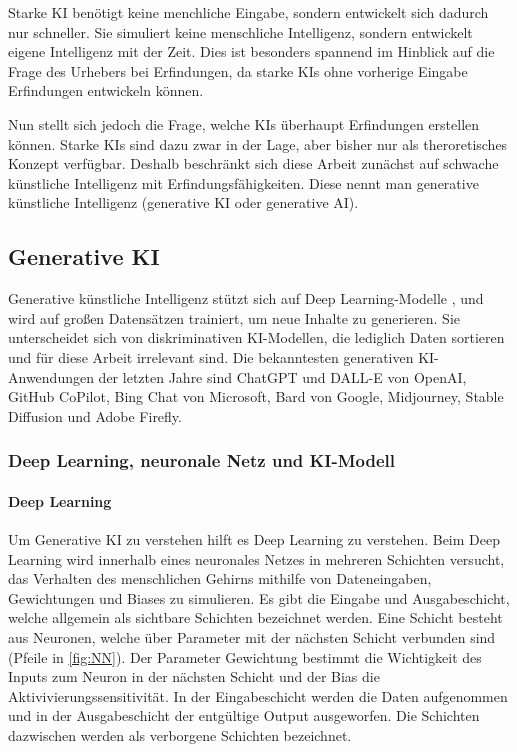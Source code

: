 Starke KI benötigt keine menchliche Eingabe, 
sondern entwickelt sich dadurch nur schneller. 
Sie simuliert keine menschliche Intelligenz, 
sondern entwickelt eigene Intelligenz mit der Zeit. 
Dies ist besonders spannend im Hinblick auf die Frage 
des Urhebers bei Erfindungen, 
da starke KIs ohne vorherige Eingabe Erfindungen entwickeln können.
\cite{WasIstStarke2023}

Nun stellt sich jedoch die Frage,
welche KIs überhaupt 
Erfindungen erstellen können. Starke KIs sind dazu zwar in 
der Lage, aber bisher nur als theroretisches Konzept verfügbar. 
Deshalb beschränkt sich diese Arbeit zunächst auf schwache künstliche Intelligenz
mit Erfindungsfähigkeiten. Diese nennt man generative künstliche Intelligenz 
(generative KI oder generative AI).

\subsection{Generative KI}
Generative künstliche Intelligenz 
stützt sich auf Deep Learning-Modelle , 
und wird auf großen Datensätzen trainiert, um neue Inhalte zu generieren.  
Sie unterscheidet sich von diskriminativen KI-Modellen, 
die lediglich Daten sortieren und für diese Arbeit irrelevant sind. 
Die bekanntesten generativen KI-Anwendungen der letzten Jahre sind
ChatGPT und DALL-E von OpenAI, GitHub CoPilot, Bing Chat von Microsoft, 
Bard von Google, Midjourney, Stable Diffusion und Adobe Firefly. \cite{WasIstGenerative}

\subsubsection{Deep Learning, neuronale Netz und KI-Modell}

\paragraph{Deep Learning}
Um Generative KI zu verstehen hilft es Deep Learning zu verstehen.
Beim Deep Learning wird innerhalb eines neuronales Netzes in
mehreren Schichten versucht, 
das Verhalten des menschlichen Gehirns mithilfe von Dateneingaben, 
Gewichtungen und Biases zu simulieren. 
Es gibt die Eingabe und Ausgabeschicht, 
welche allgemein als sichtbare Schichten bezeichnet werden.
Eine Schicht besteht aus Neuronen, welche über Parameter 
mit der nächsten Schicht verbunden sind (Pfeile in \ref{fig:NN}).
Der Parameter Gewichtung bestimmt die Wichtigkeit des Inputs 
zum Neuron in der nächsten Schicht und der Bias die Aktivivierungssensitivität.
In der Eingabeschicht werden die Daten aufgenommen und 
in der Ausgabeschicht der entgültige Output ausgeworfen.
Die Schichten dazwischen werden als verborgene Schichten bezeichnet.
\cite{WasIstDeep2023}
\cite{KuenstlicheIntelligenz}
\\
\\
